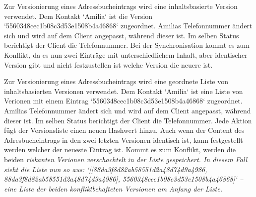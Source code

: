 \begin{description}[leftmargin=0.5cm,style=nextline]
  \item[Szenario V5:]%
  Zur Versionierung eines Adressbucheintrags wird eine inhaltsbasierte Version verwendet. Dem Kontakt `Amilia` ist die Version `5560348cec1b08c3d53e1508b4a46868` zugeordnet. Amilias Telefonnummer ändert sich und wird auf dem Client angepasst, während dieser  ist. Im selben Status berichtigt der Client die Telefonnummer. Bei der Synchronisation kommt es zum Konflikt, da es nun zwei Einträge mit unterschiedlichem Inhalt, aber identischer Version gibt und nicht festzustellen ist welche Version die neuere ist.\\
  \item[Szenario V6:] %
  Zur Versionierung eines Adressbucheintrags wird eine geordnete Liste von inhaltsbasierten Versionen verwendet.
  Dem Kontakt `Amilia` ist eine Liste von Verionen mit einem Eintrag `5560348cec1b08c3d53e1508b4a46868` zugeordnet. Amilias Telefonnummer ändert sich und wird auf dem Client angepasst, während dieser  ist. Im selben Status berichtigt der Client die Telefonnummer. Jede Aktion fügt der Versionsliste einen neuen Hashwert hinzu. Auch wenn der Content des Adresbucheintrags in den zwei letzten Versionen identisch ist, kann festgestellt werden welcher der neueste Eintrag ist. Kommt es zum Konflikt, werden die beiden \it{riskanten} Verionen verschachtelt in der Liste gespeichert. In diesem Fall sieht die Liste nun so aus: `[[88da3f8d82ab58551d2a48d74d9a4986, 88da3f8d82ab58551d2a48d74d9a4986], 5560348cec1b08c3d53e1508b4a46868]` -- eine Liste der beiden konfliktbehafteten Versionen am Anfang der Liste.
\end{description}
%
%
